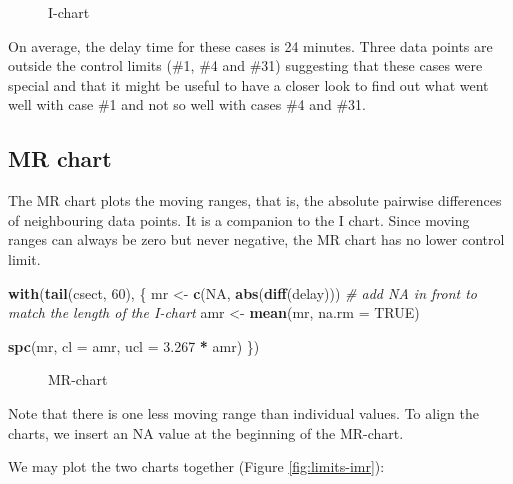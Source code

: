 \documentclass[
]{book}
\makeatletter
\newenvironment{Shaded}{\begin{snugshade}}{\end{snugshade}}
\newcommand{\AttributeTok}[1]{\textcolor[rgb]{0.13,0.29,0.53}{#1}}
\newcommand{\CommentTok}[1]{\textcolor[rgb]{0.56,0.35,0.01}{\textit{#1}}}
\newcommand{\ConstantTok}[1]{\textcolor[rgb]{0.56,0.35,0.01}{#1}}
\newcommand{\DecValTok}[1]{\textcolor[rgb]{0.00,0.00,0.81}{#1}}
\newcommand{\FloatTok}[1]{\textcolor[rgb]{0.00,0.00,0.81}{#1}}
\newcommand{\FunctionTok}[1]{\textcolor[rgb]{0.13,0.29,0.53}{\textbf{#1}}}
\newcommand{\NormalTok}[1]{#1}
\newcommand{\OtherTok}[1]{\textcolor[rgb]{0.56,0.35,0.01}{#1}}
\newcommand{\SpecialCharTok}[1]{\textcolor[rgb]{0.81,0.36,0.00}{\textbf{#1}}}
\newcommand*\pandocbounded[1]{%
  \sbox\pandoc@box{#1}%
  \Gscale@div\@tempa{\textheight}{\dimexpr\ht\pandoc@box+\dp\pandoc@box\relax}%
  \Gscale@div\@tempb{\linewidth}{\wd\pandoc@box}%
  \ifdim\@tempb\p@<\@tempa\p@\let\@tempa\@tempb\fi%
  \ifdim\@tempa\p@<\p@\scalebox{\@tempa}{\usebox\pandoc@box}%
  \else\usebox{\pandoc@box}%
  \fi%
}
\makeatother
\begin{document}
\begin{figure}
\centering
\pandocbounded{}
\caption{\label{fig:limits-i}I-chart}
\end{figure}

On average, the delay time for these cases is 24 minutes. Three data points are outside the control limits (\#1, \#4 and \#31) suggesting that these cases were special and that it might be useful to have a closer look to find out what went well with case \#1 and not so well with cases \#4 and \#31.

\subsection{MR chart}\label{mr-chart}

The MR chart plots the moving ranges, that is, the absolute pairwise differences of neighbouring data points. It is a companion to the I chart. Since moving ranges can always be zero but never negative, the MR chart has no lower control limit.

\begin{Shaded}
\begin{Highlighting}[]
\FunctionTok{with}\NormalTok{(}\FunctionTok{tail}\NormalTok{(csect, }\DecValTok{60}\NormalTok{), \{}
\NormalTok{  mr  }\OtherTok{\textless{}{-}} \FunctionTok{c}\NormalTok{(}\ConstantTok{NA}\NormalTok{, }\FunctionTok{abs}\NormalTok{(}\FunctionTok{diff}\NormalTok{(delay)))  }\CommentTok{\# add NA in front to match the length of the I{-}chart}
\NormalTok{  amr }\OtherTok{\textless{}{-}} \FunctionTok{mean}\NormalTok{(mr, }\AttributeTok{na.rm =} \ConstantTok{TRUE}\NormalTok{)}
  
  \FunctionTok{spc}\NormalTok{(mr,}
      \AttributeTok{cl  =}\NormalTok{ amr,}
      \AttributeTok{ucl =} \FloatTok{3.267} \SpecialCharTok{*}\NormalTok{ amr)}
\NormalTok{\})}
\end{Highlighting}
\end{Shaded}

\begin{figure}
\centering
\pandocbounded{}
\caption{\label{fig:limits-mr}MR-chart}
\end{figure}

Note that there is one less moving range than individual values. To align the charts, we insert an NA value at the beginning of the MR-chart.

We may plot the two charts together (Figure \ref{fig:limits-imr}):
\end{document}

